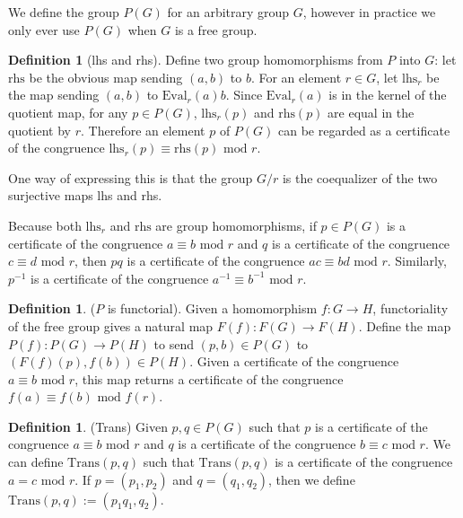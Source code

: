 \documentclass[12pt]{article} %
\theoremstyle{definition}
\theoremstyle{definition}
\theoremstyle{definition}
\theoremstyle{definition}
\newtheorem{defn}[thm]{Definition}
\begin{document}
We define the group $P(G)$ for an arbitrary group $G$, however in practice we only
ever use $P(G)$ when $G$ is a free group.

\begin{defn}[lhs and rhs]
Define two group homomorphisms from $P$ into $G$: let
$\text{rhs}$ be the obvious map sending $(a, b)$ to $b$.
For an element $r \in G$, let $\text{lhs}_r$ be the map sending
$(a,b)$ to $\text{Eval}_r(a)b$.
Since $\text{Eval}_r(a)$ is in the kernel of the quotient map,
for any $p\in P(G)$, $\text{lhs}_r(p)$ and $\text{rhs}(p)$ are equal in the quotient by $r$.
Therefore an element $p$ of $P(G)$ can be regarded as a certificate of the congruence
$\text{lhs}_r(p) \equiv \text{rhs}(p) \text{ mod } r$.
\end{defn}

One way of expressing this is that the group $G / r$ is the coequalizer of
the two surjective maps lhs and rhs.


Because both $\text{lhs}_r$ and $\text{rhs}$ are group homomorphisms, if $p \in P(G)$ is a certificate
of the congruence $a \equiv b \text{ mod } r$ and $q$ is a certificate of the congruence
$c \equiv d \text{ mod } r$, then $pq$ is a certificate of the congruence $ac \equiv bd \text{ mod } r$.
Similarly, $p^{-1}$ is a certificate of the congruence $a^{-1} \equiv b^{-1} \text{ mod } r$.

\begin{defn}($P$ is functorial).
  Given a homomorphism $f: G \to H$,
  functoriality of the free group gives a natural map $F(f): F(G) \to F(H)$.
  Define the map $P(f): P(G) \to P(H)$ to send $(p, b) \in P(G)$ to $(F(f)(p), f(b)) \in P(H)$.
  Given a certificate of the congruence $a \equiv b \text{ mod } r$, this map returns
  a certificate of the congruence $f(a) \equiv f(b) \text{ mod } f(r)$.
\end{defn}

\begin{defn}(Trans)
  Given $p,q \in P(G)$ such that $p$ is a certificate of the congruence $a \equiv b \text{ mod } r$
  and $q$ is a certificate of the congruence $b \equiv c \text{ mod } r$. We can define
  $\text{Trans}(p,q)$ such that $\text{Trans}(p,q)$ is a certificate of the congruence
  $a = c \text{ mod } r$.
  If $p = (p_1, p_2)$ and $q = (q_1, q_2)$, then we define $\text{Trans}(p,q) := (p_1q_1, q_2)$.
\end{defn}
\end{document}
